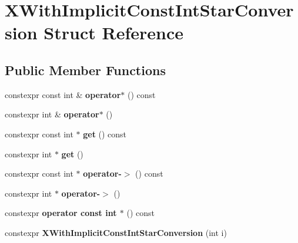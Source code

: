 \hypertarget{struct_x_with_implicit_const_int_star_conversion}{}\section{X\+With\+Implicit\+Const\+Int\+Star\+Conversion Struct Reference}
\label{struct_x_with_implicit_const_int_star_conversion}
\subsection*{Public Member Functions}
\begin{DoxyCompactItemize}
\item 
\mbox{\label{struct_x_with_implicit_const_int_star_conversion_a6c5b9198ac6f481efbc694331b31518b}} 
constexpr const int \& {\bfseries operator$\ast$} () const
\item 
\mbox{\label{struct_x_with_implicit_const_int_star_conversion_ab5fa9d26cd5f24be161cfade8f2ee185}} 
constexpr int \& {\bfseries operator$\ast$} ()
\item 
\mbox{\label{struct_x_with_implicit_const_int_star_conversion_a5ce14564f2e9273ddaac6dac6793a4fc}} 
constexpr const int $\ast$ {\bfseries get} () const
\item 
\mbox{\label{struct_x_with_implicit_const_int_star_conversion_a96a9a6e8b25a662931b10f1923bb0f2e}} 
constexpr int $\ast$ {\bfseries get} ()
\item 
\mbox{\label{struct_x_with_implicit_const_int_star_conversion_a3610f00ccf2378b7660c682b67d8b45b}} 
constexpr const int $\ast$ {\bfseries operator-\/$>$} () const
\item 
\mbox{\label{struct_x_with_implicit_const_int_star_conversion_ad3b948264006558cdb90eb200bb77ee6}} 
constexpr int $\ast$ {\bfseries operator-\/$>$} ()
\item 
\mbox{\label{struct_x_with_implicit_const_int_star_conversion_a45045c8083e6d9b7e7cb02b460cc4053}} 
constexpr {\bfseries operator const int $\ast$} () const
\item 
\mbox{\label{struct_x_with_implicit_const_int_star_conversion_aa4ec1a57181e0e00301303dbe23ee815}} 
constexpr {\bfseries X\+With\+Implicit\+Const\+Int\+Star\+Conversion} (int i)
\end{DoxyCompactItemize}
